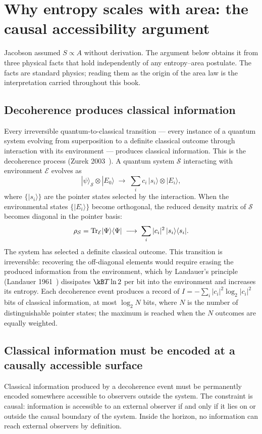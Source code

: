 \section{Why entropy scales with area: the causal accessibility argument}\label{sec:bk_area}
Jacobson assumed $S\propto A$ without derivation. The argument below obtains it from three physical facts that hold independently of any
entropy--area postulate. The facts are standard physics; reading them as the origin of the area law is the interpretation carried throughout this book. \interp

\subsection{Decoherence produces classical information}
Every irreversible quantum-to-classical transition --- every instance of a quantum system evolving from superposition to a definite classical outcome
through interaction with its environment --- produces classical information. This is the decoherence process (Zurek 2003~\cite{Zurek2003}). A quantum system
$\mathcal S$ interacting with environment $\mathcal E$ evolves as
\begin{equation}
|\psi\rangle_{\mathcal S}\otimes|E_0\rangle\;\longrightarrow\;\sum_i c_i\,|s_i\rangle\otimes|E_i\rangle,\label{eq:bk_decoherence}
\end{equation}
where $\{|s_i\rangle\}$ are the pointer states selected by the interaction. When the environmental states $\{|E_i\rangle\}$ become orthogonal, the reduced
density matrix of $\mathcal S$ becomes diagonal in the pointer basis:
\begin{equation}
\rho_{\mathcal S}={\rm Tr}_{\mathcal E}|\Psi\rangle\langle\Psi|\;\longrightarrow\;\sum_i|c_i|^2\,|s_i\rangle\langle s_i|.\label{eq:bk_diagonal}
\end{equation}
The system has selected a definite classical outcome. This transition is irreversible: recovering the off-diagonal elements would require erasing the
produced information from the environment, which by Landauer's principle (Landauer 1961~\cite{Landauer1961}) dissipates $\kB T\ln2$ per bit into the environment
and increases its entropy. Each decoherence event produces a record of $I=-\sum_i|c_i|^2\log_2|c_i|^2$ bits of classical information, at most
$\log_2N$ bits, where $N$ is the number of distinguishable pointer states; the maximum is reached when the $N$ outcomes are equally weighted. \derived

\subsection{Classical information must be encoded at a causally accessible surface}
Classical information produced by a decoherence event must be permanently encoded somewhere accessible to observers outside the system. The
constraint is causal: information is accessible to an external observer if and only if it lies on or outside the causal boundary of the system.
Inside the horizon, no information can reach external observers by definition.

